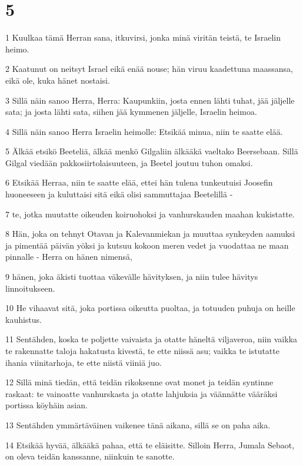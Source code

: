 \chapter{5}

\par 1 Kuulkaa tämä Herran sana, itkuvirsi, jonka minä viritän teistä, te Israelin heimo.
\par 2 Kaatunut on neitsyt Israel eikä enää nouse; hän viruu kaadettuna maassansa, eikä ole, kuka hänet nostaisi.
\par 3 Sillä näin sanoo Herra, Herra: Kaupunkiin, josta ennen lähti tuhat, jää jäljelle sata; ja josta lähti sata, siihen jää kymmenen jäljelle, Israelin heimoa.
\par 4 Sillä näin sanoo Herra Israelin heimolle: Etsikää minua, niin te saatte elää.
\par 5 Älkää etsikö Beeteliä, älkää menkö Gilgaliin älkääkä vaeltako Beersebaan. Sillä Gilgal viedään pakkosiirtolaisuuteen, ja Beetel joutuu tuhon omaksi.
\par 6 Etsikää Herraa, niin te saatte elää, ettei hän tulena tunkeutuisi Joosefin huoneeseen ja kuluttaisi sitä eikä olisi sammuttajaa Beetelillä -
\par 7 te, jotka muutatte oikeuden koiruohoksi ja vanhurskauden maahan kukistatte.
\par 8 Hän, joka on tehnyt Otavan ja Kalevanmiekan ja muuttaa synkeyden aamuksi ja pimentää päivän yöksi ja kutsuu kokoon meren vedet ja vuodattaa ne maan pinnalle - Herra on hänen nimensä,
\par 9 hänen, joka äkisti tuottaa väkevälle hävityksen, ja niin tulee hävitys linnoitukseen.
\par 10 He vihaavat sitä, joka portissa oikeutta puoltaa, ja totuuden puhuja on heille kauhistus.
\par 11 Sentähden, koska te poljette vaivaista ja otatte häneltä viljaveroa, niin vaikka te rakennatte taloja hakatusta kivestä, te ette niissä asu; vaikka te istutatte ihania viinitarhoja, te ette niistä viiniä juo.
\par 12 Sillä minä tiedän, että teidän rikoksenne ovat monet ja teidän syntinne raskaat: te vainoatte vanhurskasta ja otatte lahjuksia ja väännätte vääräksi portissa köyhäin asian.
\par 13 Sentähden ymmärtäväinen vaikenee tänä aikana, sillä se on paha aika.
\par 14 Etsikää hyvää, älkääkä pahaa, että te eläisitte. Silloin Herra, Jumala Sebaot, on oleva teidän kanssanne, niinkuin te sanotte.
